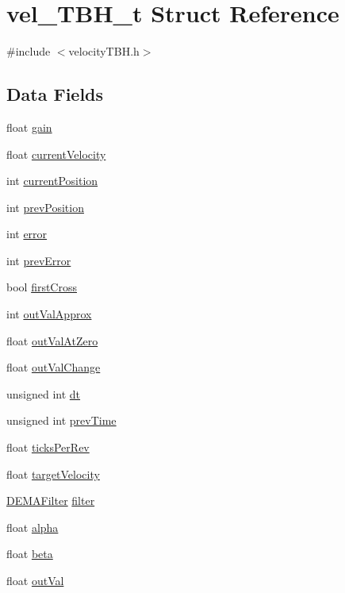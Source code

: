 \hypertarget{structvel___t_b_h__t}{}\section{vel\+\_\+\+T\+B\+H\+\_\+t Struct Reference}
\label{structvel___t_b_h__t}


{\ttfamily \#include $<$velocity\+T\+B\+H.\+h$>$}

\subsection*{Data Fields}
\begin{DoxyCompactItemize}
\item 
float \hyperlink{structvel___t_b_h__t_a3dae196304cbad467b0c571458be0903}{gain}
\item 
float \hyperlink{structvel___t_b_h__t_aca66212ca65b0d361dbb04e7a485a833}{current\+Velocity}
\item 
int \hyperlink{structvel___t_b_h__t_a45bd0503758c8aa60ef367d6fc0cb83a}{current\+Position}
\item 
int \hyperlink{structvel___t_b_h__t_a8a73c7f0d58d5c618e79fd115991ae3e}{prev\+Position}
\item 
int \hyperlink{structvel___t_b_h__t_af88264f7a8223ba3702c5cdf0ada1aa8}{error}
\item 
int \hyperlink{structvel___t_b_h__t_a4af51cbbc3eea303036a541be1f33a8c}{prev\+Error}
\item 
bool \hyperlink{structvel___t_b_h__t_a8cafb3c5519c8e3ce977ec049f0c3030}{first\+Cross}
\item 
int \hyperlink{structvel___t_b_h__t_ab614279bb80e0cb0f3b9c5f233723ef9}{out\+Val\+Approx}
\item 
float \hyperlink{structvel___t_b_h__t_a5ce46aba222e7fb454ccc483f70a57ba}{out\+Val\+At\+Zero}
\item 
float \hyperlink{structvel___t_b_h__t_a36383c2c0f4fdc84f50bb2325e11aa40}{out\+Val\+Change}
\item 
unsigned int \hyperlink{structvel___t_b_h__t_ad3ba59e88bd74ccc717a83e8f0bca52b}{dt}
\item 
unsigned int \hyperlink{structvel___t_b_h__t_ad78d9da9d240113ebb07ae8718f59754}{prev\+Time}
\item 
float \hyperlink{structvel___t_b_h__t_a23391a4f1701b22da1c18fa62ef16ec9}{ticks\+Per\+Rev}
\item 
float \hyperlink{structvel___t_b_h__t_a32592241f4affebd8af140c787df2d61}{target\+Velocity}
\item 
\hyperlink{filter_8h_a7dde035e516b0067d35e0a4580bec1f5}{D\+E\+M\+A\+Filter} \hyperlink{structvel___t_b_h__t_a8eb5086a7901c06e65780fd39169d9d2}{filter}
\item 
float \hyperlink{structvel___t_b_h__t_a1444522f927f0f629e1195bfb37d6912}{alpha}
\item 
float \hyperlink{structvel___t_b_h__t_abda115b47f5bb8ef32e0012a2cd86a89}{beta}
\item 
float \hyperlink{structvel___t_b_h__t_a73770f40b4db03838b3d6dfeeb471d05}{out\+Val}
\end{DoxyCompactItemize}


